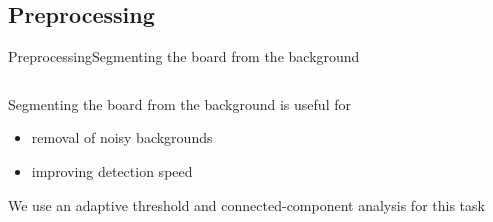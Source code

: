 \documentclass[table]{beamer}
\begin{document}
\subsection{Preprocessing}
\begin{frame}{Preprocessing}{Segmenting the board from the background}
	\begin{columns}
		\begin{column}{0.5\textwidth}
			Segmenting the board from the background is useful for
			\begin{itemize}
				\item removal of noisy backgrounds
				\item improving detection speed
			\end{itemize}
			\vspace{0.5cm}
			We use an adaptive threshold and connected-component analysis for this task
		\end{column}


\end{columns}
\end{frame}
\end{document}
